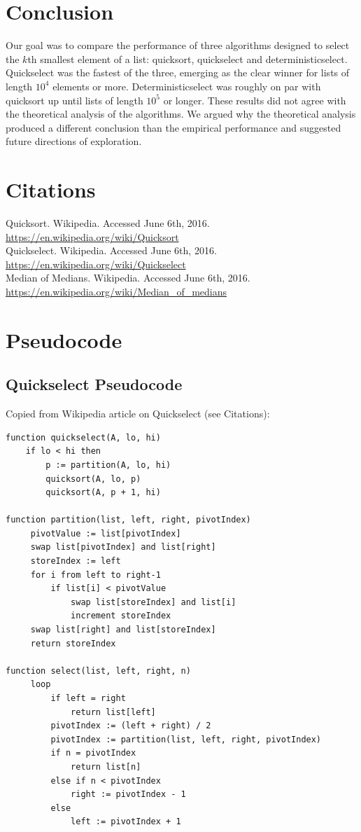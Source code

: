 \documentclass{article}
\begin{document}
\section*{Conclusion}
\indent \indent Our goal was to compare the performance of three algorithms designed to select the $k$th smallest element of a list: quicksort, quickselect and deterministicselect. Quickselect was the fastest of the three, emerging as the clear winner for lists of length $10^4$ elements or more. Deterministicselect was roughly on par with quicksort up until lists of length $10^5$ or longer. These results did not agree with the theoretical analysis of the algorithms. We argued why the theoretical analysis produced a different conclusion than the empirical performance and suggested future directions of exploration.

\section*{Citations}
Quicksort. Wikipedia. Accessed June 6th, 2016. \url{https://en.wikipedia.org/wiki/Quicksort}\\

\noindent Quickselect. Wikipedia. Accessed June 6th, 2016. \url{https://en.wikipedia.org/wiki/Quickselect}\\

\noindent Median of Medians. Wikipedia. Accessed June 6th, 2016. \url{https://en.wikipedia.org/wiki/Median_of_medians}

\pagebreak

\section*{Pseudocode}

\subsection*{Quickselect Pseudocode}
Copied from Wikipedia article on Quickselect (see Citations):
\begin{lstlisting}
function quickselect(A, lo, hi)
    if lo < hi then
        p := partition(A, lo, hi)
        quicksort(A, lo, p)
        quicksort(A, p + 1, hi)
        
function partition(list, left, right, pivotIndex)
     pivotValue := list[pivotIndex]
     swap list[pivotIndex] and list[right]
     storeIndex := left
     for i from left to right-1
         if list[i] < pivotValue
             swap list[storeIndex] and list[i]
             increment storeIndex
     swap list[right] and list[storeIndex]
     return storeIndex
     
function select(list, left, right, n)
     loop
         if left = right
             return list[left]
         pivotIndex := (left + right) / 2
         pivotIndex := partition(list, left, right, pivotIndex)
         if n = pivotIndex
             return list[n]
         else if n < pivotIndex
             right := pivotIndex - 1
         else
             left := pivotIndex + 1
\end{lstlisting}
\end{document}
